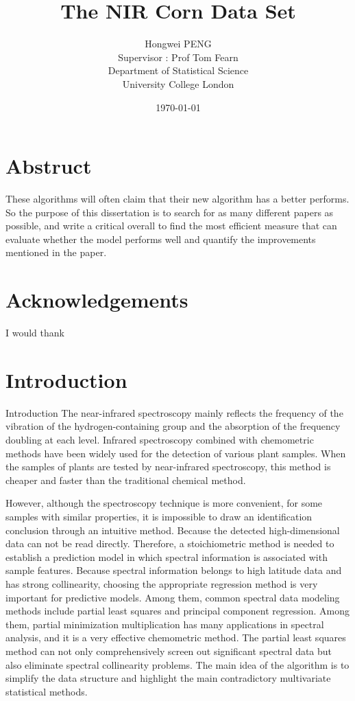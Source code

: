 \documentclass[a4paper,12pt,titlepage]{article} %
\title{The NIR Corn Data Set}
\author{Hongwei PENG \vspace{2cm} \\
	Supervisor : Prof Tom Fearn \vspace{2cm} \\
	Department of Statistical Science \\
	University College London}
\date{\today} %
\numberwithin{equation}{section}  %
\begin{document}
	\maketitle         %
	
	\section{Abstruct} 
	These algorithms will often claim that their new algorithm has a better performs. So the purpose of this dissertation is to search for as many different papers as possible, and write a critical overall to find the most efficient measure that can evaluate whether the model performs well and quantify the improvements mentioned in the paper.
	\newpage           %
	
	\section{Acknowledgements} 
 	I would thank
	\newpage           %
	
	\tableofcontents   %
	\newpage           %
	

	
	\section{Introduction}             %
	\label{sec:intro}                  %
	
	Introduction
	The near-infrared spectroscopy mainly reflects the frequency of the vibration of the hydrogen-containing group and the absorption of the frequency doubling at each level. Infrared spectroscopy combined with chemometric methods have been widely used for the detection of various plant samples. When the samples of plants are tested by near-infrared spectroscopy, this method is cheaper and faster than the traditional chemical method.
	
	However, although the spectroscopy technique is more convenient, for some samples with similar properties, it is impossible to draw an identification conclusion through an intuitive method. Because the detected high-dimensional data can not be read directly. Therefore, a stoichiometric method is needed to establish a prediction model in which spectral information is associated with sample features. Because spectral information belongs to high latitude data and has strong collinearity, choosing the appropriate regression method is very important for predictive models. Among them, common spectral data modeling methods include partial least squares and principal component regression. Among them, partial minimization multiplication has many applications in spectral analysis, and it is a very effective chemometric method. The partial least squares method can not only comprehensively screen out significant spectral data but also eliminate spectral collinearity problems. The main idea of the algorithm is to simplify the data structure and highlight the main contradictory multivariate statistical methods.
	
\end{document}
